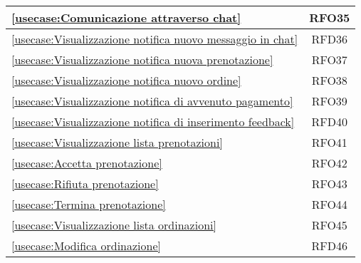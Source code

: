 \begin{longtable}{|l|c|}
	\hline
	\autoref{usecase:Comunicazione attraverso chat}                                                                                                              & RFO35                  \\
	\hline
	\autoref{usecase:Visualizzazione notifica nuovo messaggio in chat}                                                                                           & RFD36                  \\
	\hline
	\autoref{usecase:Visualizzazione notifica nuova prenotazione}                                                                                                & RFO37                  \\
	\hline
	\autoref{usecase:Visualizzazione notifica nuovo ordine}                                                                                                      & RFO38                  \\
	\hline
	\autoref{usecase:Visualizzazione notifica di avvenuto pagamento}                                                                                             & RFO39                  \\
	\hline
	\autoref{usecase:Visualizzazione notifica di inserimento feedback}                                                                                           & RFD40                  \\
	\hline
	\autoref{usecase:Visualizzazione lista prenotazioni}                                                                                                         & RFO41                  \\
	\hline
	\autoref{usecase:Accetta prenotazione}                                                                                                                       & RFO42                  \\
	\hline
	\autoref{usecase:Rifiuta prenotazione}                                                                                                                       & RFO43                  \\
	\hline
	\autoref{usecase:Termina prenotazione}                                                                                                                       & RFO44                  \\
	\hline
	\autoref{usecase:Visualizzazione lista ordinazioni}                                                                                                          & RFO45                  \\
	\hline
	\autoref{usecase:Modifica ordinazione}                                                                                                                       & RFD46                  \\

\end{longtable}
